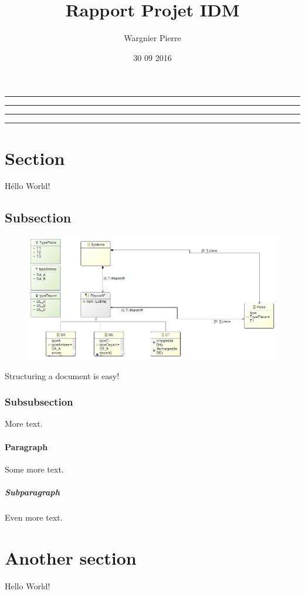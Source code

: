\documentclass{article}
\title{Rapport Projet IDM}
\date{30 09 2016}
\author{Wargnier Pierre}
\makeatletter
\renewcommand{\maketitle}{\begin{titlepage}%
    \let\footnotesize\small
    \let\footnoterule\relax
    \parindent \z@
    \reset@font
    \null
    \vskip 50\p@
    \begin{center}
      \hrule height 1pt
      \vskip 1pt 
      \hrule
      \vskip 3pt
      {\huge \bfseries \strut \@title \strut}\par
      \vskip 1pt
      \hrule
      \vskip 1pt
      \hrule height 1pt
    \end{center}
    \vskip 50\p@
    \begin{flushright}
      \Large \@author \par
    \end{flushright}
    \vfil
    \null
    
  \end{titlepage}%
  \setcounter{footnote}{0}%
}
\makeatother
\begin{document}
		
\maketitle
\newpage
{}
  
\section{Section}
  
  H\'ello World!
  
\subsection{Subsection}

\begin{figure}[h]

  \includegraphics[width=500pt,center]{classDiagram.jpg}
  \label{fig:boat1}
\end{figure}

Structuring a document is easy!

\subsubsection{Subsubsection}

More text.

\paragraph{Paragraph}

Some more text.

\subparagraph{Subparagraph}

Even more text.

\section{Another section}

Hello World!
\end{document}
